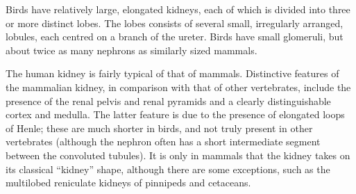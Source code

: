 Birds have relatively large, elongated kidneys, each of which is divided into three or more distinct lobes. The lobes consists of several small, irregularly arranged, lobules, each centred on a branch of the ureter. Birds have small glomeruli, but about twice as many nephrons as similarly sized mammals.

The human kidney is fairly typical of that of mammals. Distinctive features of the mammalian kidney, in comparison with that of other vertebrates, include the presence of the renal pelvis and renal pyramids and a clearly distinguishable cortex and medulla. The latter feature is due to the presence of elongated loops of Henle; these are much shorter in birds, and not truly present in other vertebrates (although the nephron often has a short intermediate segment between the convoluted tubules). It is only in mammals that the kidney takes on its classical ``kidney'' shape, although there are some exceptions, such as the multilobed reniculate kidneys of pinnipeds and cetaceans.


